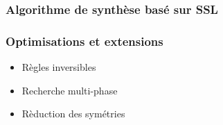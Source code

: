 \documentclass{beamer}
\begin{document}
\begin{frame}[fragile]
	\frametitle{Algorithme de synth\`ese bas\'e sur SSL}
\end{frame}
\begin{frame}[fragile]
	\frametitle{Optimisations et extensions}
	\begin{itemize}
		\item R\`egles inversibles
		\pause
		\item Recherche multi-phase
		\pause
		\item R\`eduction des sym\'etries
	\end{itemize}
\end{frame}
\end{document}
